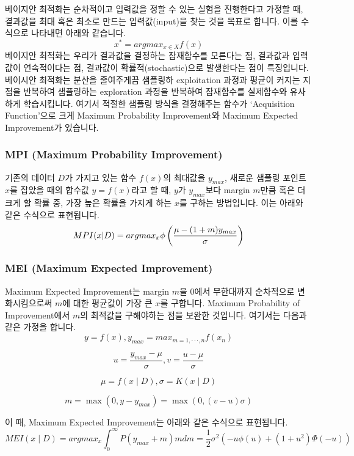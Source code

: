 \documentclass[11pt]{article}
\begin{document}
베이지안 최적화는 순차적이고 입력값을 정할 수 있는 실험을 진행한다고
가정할 때, 결과값을 최대 혹은 최소로 만드는 입력값(input)을 찾는 것을
목표로 합니다. 이를 수식으로 나타내면 아래와 같습니다.
\[ x^{*} = argmax_{x\in X}f(x)\] 베이지안 최적화는 우리가 결과값을
결정하는 잠재함수를 모른다는 점, 결과값과 입력값이 연속적이다는 점,
결과값이 확률적(stochastic)으로 발생한다는 점이 특징입니다. 베이시안
최적화는 분산을 줄여주게끔 샘플링하 exploitation 과정과 평균이 커지는
지점을 반복하여 샘플링하는 exploration 과정을 반복하여 잠재함수를
실제함수와 유사하게 학습시킵니다. 여기서 적절한 샘플링 방식을 결정해주는
함수가 `Acquisition Function'으로 크게 Maximum Probability Improvement와
Maximum Expected Improvement가 있습니다.

\hypertarget{mpi-maximum-probability-improvement}{%
\subsubsection{MPI (Maximum Probability
Improvement)}\label{mpi-maximum-probability-improvement}}

기존의 데이터 \(D\)가 가지고 있는 함수 \(f(x)\)의 최대값을 \(y_{max}\),
새로운 샘플링 포인트 \(x\)를 잡았을 때의 합수값 \(y = f(x)\)라고 할 때,
\(y\)가 \(y_{max}\)보다 margin \(m\)만큼 혹은 더 크게 할 확률 중, 가장
높은 확률을 가지게 하는 \(x\)를 구하는 방법입니다. 이는 아래와 같은
수식으로 표현됩니다.
\[ MPI(x|D) = argmax_{x}\space\phi\left(\frac{\mu-(1+m)y_{max}}{\sigma}\right)\]

\hypertarget{mei-maximum-expected-improvement}{%
\subsubsection{MEI (Maximum Expected
Improvement)}\label{mei-maximum-expected-improvement}}

Maximum Expected Improvement는 margin \(m\)을 \(0\)에서 무한대까지
순차적으로 변화시킴으로써 \(m\)에 대한 평균값이 가장 큰 \(x\)를
구합니다. Maximum Probability of Improvement에서 \(m\)의 최적값을
구해야하는 점을 보완한 것입니다. 여기서는 다음과 같은 가정을 합니다.
\[y = f(x), y_{max} = max_{m=1,··· ,n}f(x_n)\]

\[u = \frac{y_{max} − \mu}{\sigma}, v=\frac{u-\mu}{\sigma}\]

\[\mu = f\left(x \mid D\right), \sigma = K\left(x \mid D\right)\]

\[m = \max\left(0, y − y_{max}\right) = \max\left(0,\left(v − u\right)\sigma\right)\]

이 때, Maximum Expected Improvement는 아래와 같은 수식으로 표현됩니다.
\[MEI\left(x \mid D\right) = argmax_x \int_{0}^{\infty}P(y_{max} + m)m dm = \frac{1}{2}\sigma^2\left(-u\phi(u)+(1+u^2)\Phi(-u)\right)\]
\end{document}
